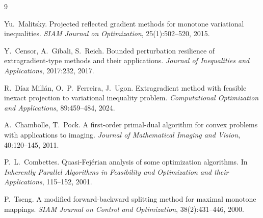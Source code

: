 \documentclass[11pt]{article}
\theoremstyle{plain}
\theoremstyle{definition}
\theoremstyle{remark}
\begin{document}
\begin{thebibliography}{9}

Yu.~Malitsky.
\newblock Projected reflected gradient methods for monotone variational
inequalities.
\newblock \emph{SIAM Journal on Optimization}, 25(1):502--520, 2015.

Y.~Censor, A.~Gibali, S.~Reich.
\newblock Bounded perturbation resilience of extragradient-type methods and
their applications.
\newblock \emph{Journal of Inequalities and Applications}, 2017:232, 2017.

R.~D\'iaz Mill\'an, O.~P.~Ferreira, J.~Ugon.
\newblock Extragradient method with feasible inexact projection to variational
inequality problem.
\newblock \emph{Computational Optimization and Applications}, 89:459--484,
2024.

A.~Chambolle, T.~Pock.
\newblock A first-order primal-dual algorithm for convex problems with
applications to imaging.
\newblock \emph{Journal of Mathematical Imaging and Vision}, 40:120--145, 2011.

P.~L.~Combettes.
\newblock Quasi-Fej\'erian analysis of some optimization algorithms.
\newblock In \emph{Inherently Parallel Algorithms in Feasibility and
Optimization and their Applications}, 115--152, 2001.

P.~Tseng.
\newblock A modified forward-backward splitting method for maximal monotone
mappings.
\newblock \emph{SIAM Journal on Control and Optimization}, 38(2):431--446,
2000.

\end{thebibliography}
\end{document}
